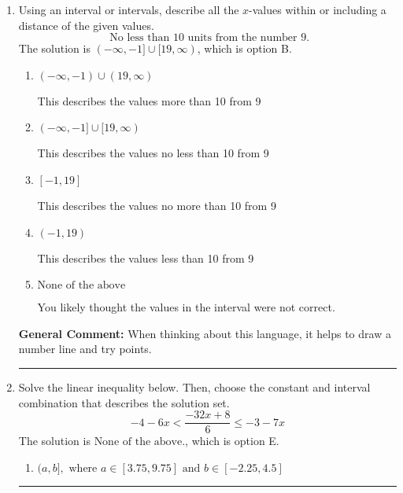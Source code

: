 \documentclass{extbook}[14pt]
\newcommand{\litem}[1]{\item #1

\rule{\textwidth}{0.4pt}}
\begin{document}
\begin{enumerate}
{\begin{enumerate}[label=\Alph*.]
* $(-\infty, 2.347]$, which is the correct option.
\item \( (-\infty, a], \text{ where } a \in [-3, 1.5] \)

 $(-\infty, -2.347]$, which corresponds to negating the endpoint of the solution.
\item \( \text{None of the above}. \)

You may have chosen this if you thought the inequality did not match the ends of the intervals.
\end{enumerate}

\textbf{General Comment:} Remember that less/greater than or equal to includes the endpoint, while less/greater do not. Also, remember that you need to flip the inequality when you multiply or divide by a negative.
}
\litem{
Using an interval or intervals, describe all the $x$-values within or including a distance of the given values.
\[ \text{ No less than } 10 \text{ units from the number } 9. \]The solution is \( (-\infty, -1] \cup [19, \infty) \), which is option B.\begin{enumerate}[label=\Alph*.]
\item \( (-\infty, -1) \cup (19, \infty) \)

This describes the values more than 10 from 9
\item \( (-\infty, -1] \cup [19, \infty) \)

This describes the values no less than 10 from 9
\item \( [-1, 19] \)

This describes the values no more than 10 from 9
\item \( (-1, 19) \)

This describes the values less than 10 from 9
\item \( \text{None of the above} \)

You likely thought the values in the interval were not correct.
\end{enumerate}

\textbf{General Comment:} When thinking about this language, it helps to draw a number line and try points.
}
\litem{
Solve the linear inequality below. Then, choose the constant and interval combination that describes the solution set.
\[ -4 - 6 x < \frac{-32 x + 8}{6} \leq -3 - 7 x \]The solution is \( \text{None of the above.} \), which is option E.\begin{enumerate}[label=\Alph*.]
\item \( (a, b], \text{ where } a \in [3.75, 9.75] \text{ and } b \in [-2.25, 4.5] \)


\end{enumerate}}
\end{enumerate}
\end{document}
